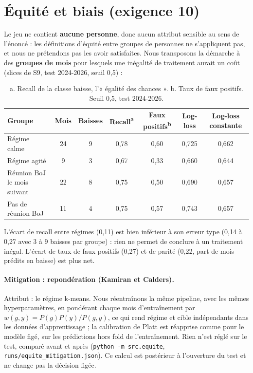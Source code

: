 \documentclass[11pt,a4paper]{article}
\begin{document}
\section{Équité et biais (exigence 10)}

Le jeu ne contient \textbf{aucune personne}, donc aucun attribut sensible au sens de l'énoncé : les définitions
d'équité entre groupes de personnes ne s'appliquent pas, et nous ne prétendons pas les avoir satisfaites. Nous
transposons la démarche à des \textbf{groupes de mois} pour lesquels une inégalité de traitement aurait un coût
(slices de S9, test 2024-2026, seuil 0,5) :

\begin{table}[H]\centering\small
\begin{tabular}{lcccccc}\toprule
Groupe & Mois & Baisses & Recall\textsuperscript{a} & Faux positifs\textsuperscript{b} & Log-loss & Log-loss constante \\\midrule
Régime calme & 24 & 9 & 0,78 & 0,60 & 0,725 & 0,662 \\
Régime agité & 9 & 3 & 0,67 & 0,33 & 0,660 & 0,644 \\
Réunion BoJ le mois suivant & 22 & 8 & 0,75 & 0,50 & 0,690 & 0,657 \\
Pas de réunion BoJ & 11 & 4 & 0,75 & 0,57 & 0,743 & 0,657 \\\bottomrule
\end{tabular}
\caption*{\small a. Recall de la classe baisse, l'« égalité des chances ». b. Taux de faux positifs. Seuil 0,5, test 2024-2026.}\end{table}

L'écart de recall entre régimes (0,11) est bien inférieur à son erreur type (0,14 à 0,27 avec 3 à 9 baisses par
groupe) : rien ne permet de conclure à un traitement inégal. L'écart de taux de faux positifs (0,27) et de parité
(0,22, part de mois prédits en baisse) est plus net.

\paragraph{Mitigation : repondération (Kamiran et Calders).} Attribut : le régime k-means. Nous réentraînons la même
pipeline, avec les mêmes hyperparamètres, en pondérant chaque mois d'entraînement par $w(g,y)=P(g)P(y)/P(g,y)$, ce qui
rend régime et cible indépendants dans les données d'apprentissage ; la calibration de Platt est réapprise comme pour
le modèle figé, sur les prédictions hors fold de l'entraînement. Rien n'est réglé sur le test, comparé avant et après
(\texttt{python -m src.equite}, \texttt{runs/equite\_mitigation.json}). Ce calcul est postérieur à l'ouverture du
test et ne change pas la décision figée.
\end{document}
